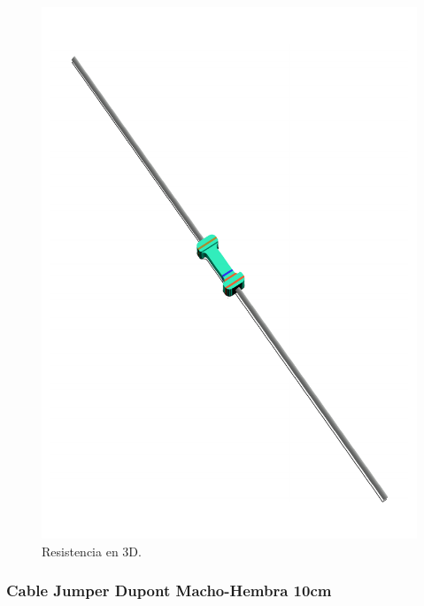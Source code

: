     \begin{figure}[H]
        \centering
        \includegraphics[scale=0.4]{15/img/resistenciaModelo.pdf}
        \caption{Resistencia en 3D.}
        \label{fig:resistenciaModelo}
    \end{figure}
    
    \subsubsection{Cable Jumper Dupont Macho-Hembra 10cm}
    
